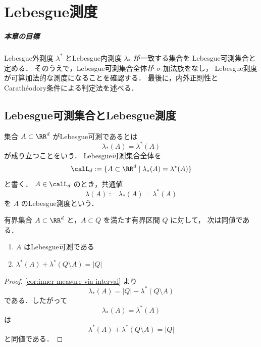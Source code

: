 \setcounter{chapter}{6}
\chapter{Lebesgue測度}

\paragraph{本章の目標}
Lebesgue外測度 $\lambda^*$ とLebesgue内測度 $\lambda_*$ が一致する集合を
Lebesgue可測集合と定める．
そのうえで，Lebesgue可測集合全体が $\sigma$-加法族をなし，
Lebesgue測度が可算加法的な測度になることを確認する．
最後に，内外正則性とCarathéodory条件による判定法を述べる．

\section{Lebesgue可測集合とLebesgue測度}

\begin{definition}[Lebesgue可測集合とLebesgue測度]
集合 $A \subset \RR^d$ がLebesgue可測であるとは
\[
\lambda_*(A)=\lambda^*(A)
\]
が成り立つことをいう．
Lebesgue可測集合全体を
\[
\calL_d:=\{A\subset\RR^d\mid \lambda_*(A)=\lambda^*(A)\}
\]
と書く．
$A\in\calL_d$ のとき，共通値
\[
\lambda(A):=\lambda_*(A)=\lambda^*(A)
\]
を $A$ のLebesgue測度という．
\end{definition}

\begin{lemma}[有界集合の区間判定]\label{lem:bounded-measurable-interval-criterion}
有界集合 $A\subset\RR^d$ と，$A\subset Q$ を満たす有界区間 $Q$ に対して，
次は同値である．
\begin{enumerate}
    \item $A$ はLebesgue可測である
    \item $\lambda^*(A)+\lambda^*(Q\setminus A)=|Q|$
\end{enumerate}
\end{lemma}
\begin{proof}
\cref{cor:inner-measure-via-interval} より
\[
\lambda_*(A)=|Q|-\lambda^*(Q\setminus A)
\]
である．したがって
\[
\lambda_*(A)=\lambda^*(A)
\]
は
\[
\lambda^*(A)+\lambda^*(Q\setminus A)=|Q|
\]
と同値である．
\end{proof}


